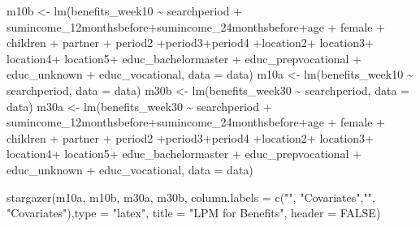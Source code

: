 \documentclass[
]{article}
\newenvironment{Shaded}{\begin{snugshade}}{\end{snugshade}}
\newcommand{\AttributeTok}[1]{\textcolor[rgb]{0.77,0.63,0.00}{#1}}
\newcommand{\ConstantTok}[1]{\textcolor[rgb]{0.00,0.00,0.00}{#1}}
\newcommand{\FunctionTok}[1]{\textcolor[rgb]{0.00,0.00,0.00}{#1}}
\newcommand{\NormalTok}[1]{#1}
\newcommand{\OtherTok}[1]{\textcolor[rgb]{0.56,0.35,0.01}{#1}}
\newcommand{\SpecialCharTok}[1]{\textcolor[rgb]{0.00,0.00,0.00}{#1}}
\newcommand{\StringTok}[1]{\textcolor[rgb]{0.31,0.60,0.02}{#1}}
\begin{document}
\begin{Shaded}
\begin{Highlighting}[]
\NormalTok{m10b }\OtherTok{\textless{}{-}} \FunctionTok{lm}\NormalTok{(benefits\_week10 }\SpecialCharTok{\textasciitilde{}}\NormalTok{ searchperiod }\SpecialCharTok{+}\NormalTok{ sumincome\_12monthsbefore}\SpecialCharTok{+}\NormalTok{sumincome\_24monthsbefore}\SpecialCharTok{+}\NormalTok{age }\SpecialCharTok{+}\NormalTok{ female }\SpecialCharTok{+}\NormalTok{ children }\SpecialCharTok{+}\NormalTok{ partner }\SpecialCharTok{+}\NormalTok{ period2 }\SpecialCharTok{+}\NormalTok{period3}\SpecialCharTok{+}\NormalTok{period4 }\SpecialCharTok{+}\NormalTok{location2}\SpecialCharTok{+}\NormalTok{ location3}\SpecialCharTok{+}\NormalTok{ location4}\SpecialCharTok{+}\NormalTok{ location5}\SpecialCharTok{+}\NormalTok{ educ\_bachelormaster }\SpecialCharTok{+}\NormalTok{ educ\_prepvocational }\SpecialCharTok{+}\NormalTok{ educ\_unknown }\SpecialCharTok{+}\NormalTok{ educ\_vocational, }\AttributeTok{data =}\NormalTok{ data)}
\NormalTok{m10a }\OtherTok{\textless{}{-}} \FunctionTok{lm}\NormalTok{(benefits\_week10 }\SpecialCharTok{\textasciitilde{}}\NormalTok{ searchperiod, }\AttributeTok{data =}\NormalTok{ data)}
\NormalTok{m30b }\OtherTok{\textless{}{-}} \FunctionTok{lm}\NormalTok{(benefits\_week30 }\SpecialCharTok{\textasciitilde{}}\NormalTok{ searchperiod, }\AttributeTok{data =}\NormalTok{ data)}
\NormalTok{m30a }\OtherTok{\textless{}{-}} \FunctionTok{lm}\NormalTok{(benefits\_week30 }\SpecialCharTok{\textasciitilde{}}\NormalTok{ searchperiod }\SpecialCharTok{+}\NormalTok{ sumincome\_12monthsbefore}\SpecialCharTok{+}\NormalTok{sumincome\_24monthsbefore}\SpecialCharTok{+}\NormalTok{age }\SpecialCharTok{+}\NormalTok{ female }\SpecialCharTok{+}\NormalTok{ children }\SpecialCharTok{+}\NormalTok{ partner }\SpecialCharTok{+}\NormalTok{ period2 }\SpecialCharTok{+}\NormalTok{period3}\SpecialCharTok{+}\NormalTok{period4 }\SpecialCharTok{+}\NormalTok{location2}\SpecialCharTok{+}\NormalTok{ location3}\SpecialCharTok{+}\NormalTok{ location4}\SpecialCharTok{+}\NormalTok{ location5}\SpecialCharTok{+}\NormalTok{ educ\_bachelormaster }\SpecialCharTok{+}\NormalTok{ educ\_prepvocational }\SpecialCharTok{+}\NormalTok{ educ\_unknown }\SpecialCharTok{+}\NormalTok{ educ\_vocational, }\AttributeTok{data =}\NormalTok{ data)}

\FunctionTok{stargazer}\NormalTok{(m10a, m10b, m30a, m30b, }\AttributeTok{column.labels =} \FunctionTok{c}\NormalTok{(}\StringTok{""}\NormalTok{, }\StringTok{"Covariates"}\NormalTok{,}\StringTok{""}\NormalTok{, }\StringTok{"Covariates"}\NormalTok{),}\AttributeTok{type =} \StringTok{"latex"}\NormalTok{,}
          \AttributeTok{title =} \StringTok{"LPM for Benefits"}\NormalTok{, }\AttributeTok{header =} \ConstantTok{FALSE}\NormalTok{)}
\end{Highlighting}
\end{Shaded}
\end{document}
